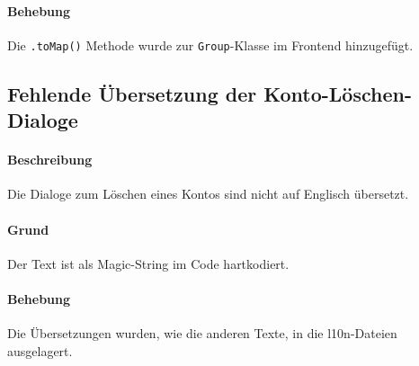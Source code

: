 \documentclass{qualitätssicherungsheft}
\begin{document}
\paragraph{Behebung} Die \texttt{.toMap()} Methode wurde zur \texttt{Group}-Klasse im Frontend hinzugefügt.
\newpage
\subsection{Fehlende Übersetzung der Konto-Löschen-Dialoge}
\paragraph*{Beschreibung} Die Dialoge zum Löschen eines Kontos sind nicht auf Englisch übersetzt.
\paragraph{Grund} Der Text ist als Magic-String im Code hartkodiert.
\paragraph{Behebung} Die Übersetzungen wurden, wie die anderen Texte, in die l10n-Dateien ausgelagert.
\newpage
\end{document}
